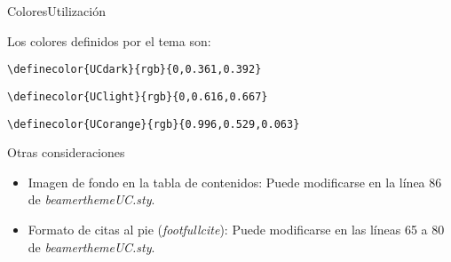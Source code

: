 \documentclass[handout,%
		aspectratio=43,%
		9pt]{beamer}
\begin{document}
\begin{frame}[fragile]{Colores}{Utilización}

Los colores definidos por el tema son:
\color{UCdark}
\begin{verbatim}
\definecolor{UCdark}{rgb}{0,0.361,0.392}
\end{verbatim}
\color{UClight}
\begin{verbatim}
\definecolor{UClight}{rgb}{0,0.616,0.667}
\end{verbatim}
\color{UCorange}
\begin{verbatim}
\definecolor{UCorange}{rgb}{0.996,0.529,0.063}
\end{verbatim}
\color{UCdark}
\end{frame}

\begin{frame}{Otras consideraciones}

\begin{itemize}
\item Imagen de fondo en la tabla de contenidos: Puede modificarse en la línea 86 de \textit{beamerthemeUC.sty}.
\item Formato de citas al pie (\emph{footfullcite}): Puede modificarse en las líneas 65 a 80 de \textit{beamerthemeUC.sty}.
\end{itemize}

\end{frame}
\end{document}
